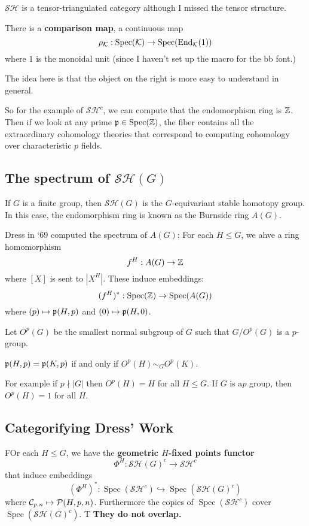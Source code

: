 \documentclass[12pt]{article}
\newcommand{\p}{\frakp}
\DeclareMathOperator{\Spec}{Spec}
\newcommand{\SH}{\mathcal{SH}}
\begin{document}
$\SH$ is a tensor-triangulated category although I missed the tensor structure.

\begin{thm}[Balmer `10]
	There is a \textbf{comparison map}, a continuous map
	\[\rho_\calK:\Spec(\calK)\to \Spec(\End_\calK(1))\]
	where $1$ is the monoidal unit (since I haven't set up the macro for the bb font.)
\end{thm}
The idea here is that the object on the right is more easy to understand in general.

So for the example of $\SH^c$, we can compute that the endomorphism ring is $\mathbb{Z}$. 
Then if we look at any prime $\p\in\Spec(\bbZ)$, the fiber contains all the extraordinary cohomology theories 
that correspond to computing cohomology over characteristic $p$ fields.

\subsection{The spectrum of \texorpdfstring{$\SH(G)$}{SH(G)}}
If $G$ is a finite group, then $\SH(G)$ is the $G$-equivariant stable homotopy group.
In this case, the endomorphism ring is known as the Burnside ring $A(G)$.

Dress in `69 computed the spectrum of $A(G)$: For each $H\le G$, we ahve a ring homomorphism 
\[f^H:A(G)\to \mathbb{Z}\]
where $[X]$ is sent to $|X^H|.$ These induce embeddings:
\[(f^H)^\ast:\Spec(\bbZ)\to\Spec(A(G))\]
where $(p)\mapsto \p(H,p)$ and $(0)\mapsto \p(H,0)$.

\begin{defn}
	Let $O^p(G)$ be the smallest normal subgroup of $G$ such that $G/O^p(G)$ is a $p$-group.
\end{defn}
\begin{thm}[Dress '69]
	$\p(H,p)=\p(K,p)$ if and only if $O^p(H)\sim_G O^p(K).$
\end{thm}
\begin{rmk}
	For example if $p\nmid |G|$ then $O^p(H)=H$ for all $H\le G$. If $G$ is a$p$ group, then $O^p(H)=1$ for all $H$.
\end{rmk}

\subsection{Categorifying Dress' Work}
FOr each $H\le G$, we have the \textbf{geometric $H$-fixed points functor}
\[\Phi^H:\SH(G)^c\to \SH^c\]
that induce embeddings 
\[(\Phi^H)^\ast:\Spec(\SH^c)\hookrightarrow \Spec(\SH(G)^c)\]
where $\mathcal{C}_{p,n}\mapsto \mathcal{P}(H,p,n)$. Furthermore the copies of $\Spec(\SH^c)$ cover $\Spec(\SH(G)^c)$. T
\textbf{They do not overlap.}
\end{document}
